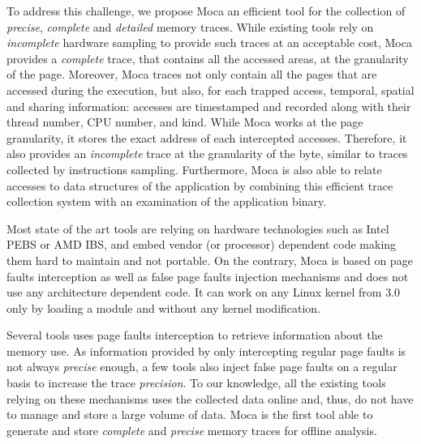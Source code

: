 To address this challenge, we propose \gls{Moca} an efficient tool for the collection of \emph{precise},
\emph{complete} and \emph{detailed} memory traces. While existing tools
rely on \emph{incomplete} hardware sampling to
provide such traces at an acceptable cost, \gls{Moca} provides a \emph{complete}
trace, that contains all the accessed areas, at the granularity of the page.
Moreover, \gls{Moca} traces not only
contain all the pages that are accessed during the execution, but also,
for each trapped access, temporal, spatial and sharing
information: accesses are timestamped and recorded along with their thread number, CPU number, and kind.
While \gls{Moca} works at the page granularity, it stores the exact
address of each intercepted accesses. Therefore, it also provides an
\emph{incomplete} trace at the granularity of the byte, similar to
traces collected by instructions sampling. Furthermore, \gls{Moca} is also able to relate accesses to
data structures of the application by combining this efficient trace collection system with an examination
of the application binary.

Most state of the art tools are relying on hardware technologies such as Intel PEBS
or AMD IBS, and embed vendor (or processor) dependent code making them hard
to maintain and not portable. On the contrary, \gls{Moca} is based on page
faults interception as well as false page faults injection mechanisms and does not use any architecture dependent code.
It can work on any Linux kernel from $3.0$ only by loading a module and
without any kernel modification.

Several tools uses page faults interception to retrieve information about the memory
use. As information provided by only intercepting regular page faults
is not always \emph{precise} enough, a few tools also inject false page faults
on a regular basis to increase the trace \emph{precision}. To our knowledge, all the
existing tools relying on these mechanisms uses the collected data online and,
thus, do not have to manage and store a large volume of data. \gls{Moca} is the
first tool able to generate and store \emph{complete} and \emph{precise} memory traces for offline
analysis.

